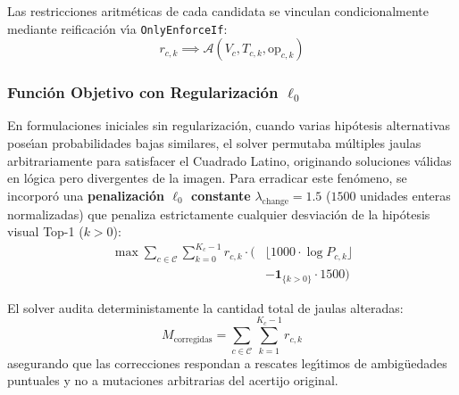 Las restricciones aritm\'eticas de cada candidata se vinculan condicionalmente mediante reificaci\'on v\'{\i}a \texttt{OnlyEnforceIf}:
\begin{equation}
    r_{c,k} \implies \mathcal{A}(V_c, T_{c,k}, \text{op}_{c,k})
\end{equation}

\subsubsection{Funci\'on Objetivo con Regularizaci\'on \texorpdfstring{$\ell_0$}{L0}}
En formulaciones iniciales sin regularizaci\'on, cuando varias hip\'otesis alternativas pose\'{\i}an probabilidades bajas similares, el solver permutaba m\'ultiples jaulas arbitrariamente para satisfacer el Cuadrado Latino, originando soluciones v\'alidas en l\'ogica pero divergentes de la imagen. Para erradicar este fen\'omeno, se incorpor\'o una \textbf{penalizaci\'on $\ell_0$ constante} $\lambda_{\text{change}} = 1.5$ ($1500$ unidades enteras normalizadas) que penaliza estrictamente cualquier desviaci\'on de la hip\'otesis visual Top-1 ($k > 0$):
\begin{equation}
\begin{aligned}
    \max \sum_{c \in \mathcal{C}} \sum_{k=0}^{K_c - 1} r_{c,k} \cdot \Big( & \lfloor 1000 \cdot \log P_{c,k} \rfloor \\
    & - \mathbf{1}_{\{k > 0\}} \cdot 1500 \Big)
\end{aligned}
\label{eq:map_objective_l0}
\end{equation}

El solver audita deterministamente la cantidad total de jaulas alteradas:
\begin{equation}
    M_{\text{corregidas}} = \sum_{c \in \mathcal{C}} \sum_{k=1}^{K_c - 1} r_{c,k}
\end{equation}
asegurando que las correcciones respondan a rescates leg\'{\i}timos de ambig\"uedades puntuales y no a mutaciones arbitrarias del acertijo original.
